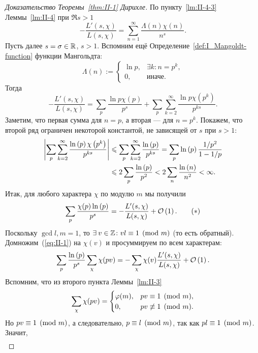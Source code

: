\begin{proof}[Доказательство Теоремы~\ref{thm:II-1} Дирихле]
    По пункту~\ref{lm:II-4-3} Леммы~\ref{lm:II-4} при $\Re{s} > 1$
    \[
        -\frac{L'(s, \chi)}{L(s, \chi)} = \sum_{n=1}^{\infty} \frac{\Lambda(n)\chi(n)}{n^s}.
    \]
    Пусть далее $s = \sigma \in \mathbb{R}$, $s>1$. Вспомним ещё Определение~\ref{def:I_Mangoldt-function} функции Мангольдта:
    \[
        \Lambda(n) := 
        \begin{cases}
            \ln{p}, & \exists k\colon n = p^k, \\
            0, & \text{иначе}.
        \end{cases}
    \]
    Тогда
    \[
        -\frac{L'(s, \chi)}{L(s, \chi)} = \sum_p \frac{\ln{p} \chi(p)}{p^s} + \sum_p \sum_{k=2}^{\infty} \frac{\ln{p} \chi\left( p^k \right)}{p^{ks}}.
    \]
    Заметим, что первая сумма для $n = p$, а вторая --- для $n = p^k$. Покажем, что второй ряд ограничен некоторой константой, не зависящей от $s$ при $s > 1$:
    \begin{align*}
        \left| 
            \sum_p \sum_{k=2}^{\infty} \frac{\operatorname{ln}\left( p \right) \chi\left( p^k \right)}{p^{ks}}
         \right| &\leqslant \sum_p \sum_{k=2}^{\infty} \frac{\operatorname{ln}\left( p \right)}{p^{ks}} = \sum_p \operatorname{ln}\left( p \right) \frac{1 / p^2}{1 - 1 / p} \\
        &\leqslant 2\sum_p \frac{\operatorname{ln}\left( p \right)}{p^2} < 2\sum_n \frac{\operatorname{ln}\left( n \right)}{n^2} < \infty.
    \end{align*}
    Итак, для любого характера $\chi$ по модулю $m$ мы получили
    \begin{equation}
        \sum_p \frac{\chi(p)\operatorname{ln}\left( p \right)}{p^s} = -\frac{L'(s, \chi)}{L(s, \chi)} + \mathcal{O}\left( 1 \right). \tag{$\ast$}\label{eq:II-1}
    \end{equation}
    Поскольку $\gcd{l, m} = 1$, то $\exists v \in \ZZ\colon \congr{vl}{1}{m}$ (то есть обратный). Домножим~(\ref{eq:II-1}) на $\chi(v)$ и просуммируем по всем характерам:
    \[
        \sum_p \frac{\operatorname{ln}\left( p \right)}{p^s} \sum_\chi \chi(pv) = -\sum_\chi \chi(v) \frac{L'(s, \chi)}{L(s, \chi)} + \mathcal{O}\left( 1 \right).
    \]
    Вспомним, что из второго пункта Леммы~\ref{lm:II-3}
    \[
        \sum_\chi \chi(pv) =
            \begin{cases}
                \varphi(m), & pv \equiv 1 \pmod m, \\
                0, & pv \not\equiv 1 \pmod{m}.
            \end{cases}
    \]
    Но $pv \equiv 1 \pmod m$, а следовательно, $p \equiv l \pmod m$, так как $pl \equiv 1 \pmod m$.~\newline
    Значит,
    \begin{align*}

\end{align*}
\end{proof}
